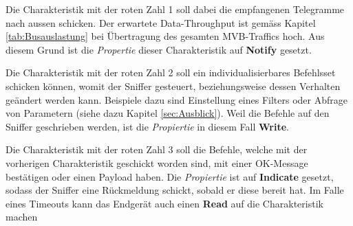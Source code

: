 Die Charakteristik mit der roten Zahl 1 soll dabei die empfangenen Telegramme nach aussen schicken. Der erwartete Data-Throughput ist gemäss Kapitel \ref{tab:Busauslastung} bei Übertragung des gesamten MVB-Traffics hoch. Aus diesem Grund ist die \textit{Propertie} dieser Charakteristik auf \textbf{Notify} gesetzt.

Die Charakteristik mit der roten Zahl 2 soll ein individualisierbares Befehlsset schicken können, womit der Sniffer gesteuert, beziehungsweise dessen Verhalten geändert werden kann. Beispiele dazu sind Einstellung eines Filters oder Abfrage von Parametern (siehe dazu Kapitel \ref{sec:Ausblick}). Weil die Befehle auf den Sniffer geschrieben werden, ist die \textit{Propiertie} in diesem Fall \textbf{Write}.

Die Charakteristik mit der roten Zahl 3 soll die Befehle, welche mit der vorherigen Charakteristik geschickt worden sind, mit einer OK-Message bestätigen oder einen Payload haben. Die \textit{Propiertie} ist auf \textbf{Indicate} gesetzt, sodass der Sniffer eine Rückmeldung schickt, sobald er diese bereit hat. Im Falle eines Timeouts kann das Endgerät auch einen \textbf{Read} auf die Charakteristik machen

